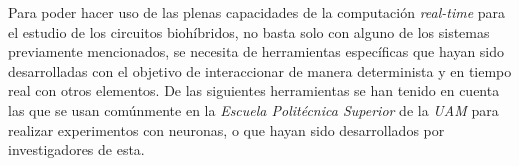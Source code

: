 
Para poder hacer uso de las plenas capacidades de la computación \textit{real-time} para el estudio de los circuitos biohíbridos, no basta solo con alguno de los sistemas previamente mencionados, se necesita de herramientas específicas que hayan sido desarrolladas con el objetivo de interaccionar de manera determinista y en tiempo real con otros elementos. De las siguientes herramientas se han tenido en cuenta las que se usan comúnmente en la \textit{Escuela Politécnica Superior} de la \textit{UAM} para realizar experimentos con neuronas, o que hayan sido desarrollados por investigadores de esta. 
